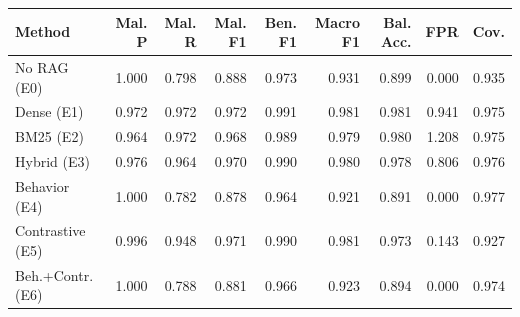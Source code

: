 \begin{tabular}{lrrrrrrrr}
\toprule
Method & Mal. P & Mal. R & Mal. F1 & Ben. F1 & Macro F1 & Bal. Acc. & FPR & Cov. \\
\midrule
No RAG (E0) & 1.000 & 0.798 & 0.888 & 0.973 & 0.931 & 0.899 & 0.000 & 0.935 \\
Dense (E1) & 0.972 & 0.972 & 0.972 & 0.991 & 0.981 & 0.981 & 0.941 & 0.975 \\
BM25 (E2) & 0.964 & 0.972 & 0.968 & 0.989 & 0.979 & 0.980 & 1.208 & 0.975 \\
Hybrid (E3) & 0.976 & 0.964 & 0.970 & 0.990 & 0.980 & 0.978 & 0.806 & 0.976 \\
Behavior (E4) & 1.000 & 0.782 & 0.878 & 0.964 & 0.921 & 0.891 & 0.000 & 0.977 \\
Contrastive (E5) & 0.996 & 0.948 & 0.971 & 0.990 & 0.981 & 0.973 & 0.143 & 0.927 \\
Beh.+Contr. (E6) & 1.000 & 0.788 & 0.881 & 0.966 & 0.923 & 0.894 & 0.000 & 0.974 \\
\bottomrule
\end{tabular}